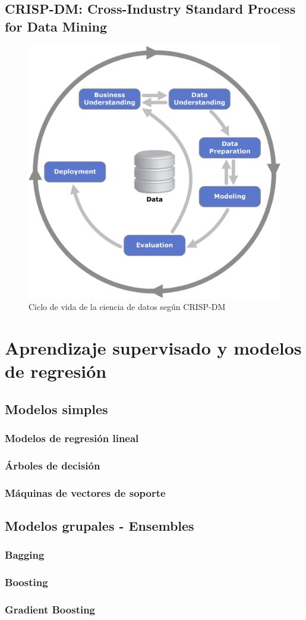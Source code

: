 \subsection{CRISP-DM: Cross-Industry Standard Process for Data Mining}

\begin{figure}[h]
	\centering
	\includegraphics[width=0.6\linewidth]{figs/chapter2/crispdm}
	\caption{Ciclo de vida de la ciencia de datos según CRISP-DM \cite{shearer2000crisp}}
	\label{fig:crispdm}
\end{figure}


\section{Aprendizaje supervisado y modelos de regresión}

\subsection{Modelos simples}

\subsubsection{Modelos de regresión lineal}

\subsubsection{Árboles de decisión}

\subsubsection{Máquinas de vectores de soporte}

\subsection{Modelos grupales - Ensembles}

\subsubsection{Bagging}

\subsubsection{Boosting}

\subsubsection{Gradient Boosting}